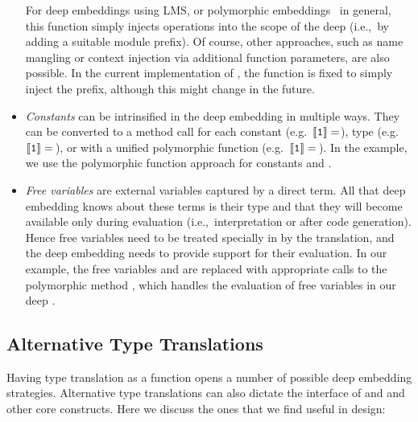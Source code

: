 \documentclass[paper.tex]{subfiles}
\begin{document}
\begin{itemize}
For deep embeddings using LMS, or polymorphic embeddings~\cite{hofer_polymorphic_2008} in general, this function simply injects operations into the scope of the deep \edsl (i.e.,\ by adding a suitable module prefix).  Of course, other approaches, such as name mangling or context injection via additional function parameters, are also possible.  In the current implementation of \tool, the  function is fixed to simply inject the  prefix, although this might change in the future.

\item \emph{Constants} can be intrinsified in the deep embedding in multiple ways. They can be converted to a method call for each constant (e.g.\ $\left\llbracket \mathtt{1} \right\rrbracket = $), type (e.g.\ $\left\llbracket \mathtt{1} \right\rrbracket = \,$), or with a unified polymorphic function (e.g.\ $\left\llbracket \mathtt{1} \right\rrbracket = \,$). In the example, we use the polymorphic function approach for constants  and .

\item \emph{Free variables} are external variables captured by a
  direct \edsl{} term.  All that deep embedding knows about these terms is
  their type and that they will become available only during evaluation (i.e.,\ interpretation or after code generation).  Hence free variables need to be treated specially in by the translation, and the deep embedding needs to provide support for their evaluation.  In our example, the free variables  and  are replaced with appropriate calls to the polymorphic method , which handles the evaluation of free variables in our deep \edsl.
\end{itemize}



\subsection{Alternative Type Translations}
\label{sec:alternative-type-translations}

Having type translation as a function opens a number of possible deep embedding strategies. Alternative type translations can also dictate the interface of  and  and other core \edsl{} constructs. Here we discuss the ones that we find useful in \edsl{} design:
\end{document}

